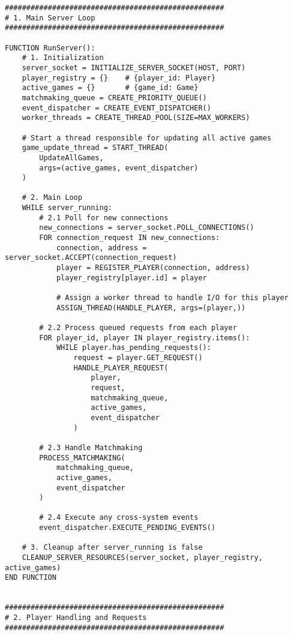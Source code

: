 \documentclass{article}
\begin{document}
\begin{lstlisting}[style=pseudo]
###################################################
# 1. Main Server Loop
###################################################

FUNCTION RunServer():
    # 1. Initialization
    server_socket = INITIALIZE_SERVER_SOCKET(HOST, PORT)
    player_registry = {}    # {player_id: Player}
    active_games = {}       # {game_id: Game}
    matchmaking_queue = CREATE_PRIORITY_QUEUE()  
    event_dispatcher = CREATE_EVENT_DISPATCHER()
    worker_threads = CREATE_THREAD_POOL(SIZE=MAX_WORKERS)
    
    # Start a thread responsible for updating all active games
    game_update_thread = START_THREAD(
        UpdateAllGames, 
        args=(active_games, event_dispatcher)
    )

    # 2. Main Loop
    WHILE server_running:
        # 2.1 Poll for new connections
        new_connections = server_socket.POLL_CONNECTIONS()
        FOR connection_request IN new_connections:
            connection, address = server_socket.ACCEPT(connection_request)
            player = REGISTER_PLAYER(connection, address)
            player_registry[player.id] = player

            # Assign a worker thread to handle I/O for this player
            ASSIGN_THREAD(HANDLE_PLAYER, args=(player,))

        # 2.2 Process queued requests from each player
        FOR player_id, player IN player_registry.items():
            WHILE player.has_pending_requests():
                request = player.GET_REQUEST()
                HANDLE_PLAYER_REQUEST(
                    player, 
                    request, 
                    matchmaking_queue, 
                    active_games, 
                    event_dispatcher
                )

        # 2.3 Handle Matchmaking
        PROCESS_MATCHMAKING(
            matchmaking_queue, 
            active_games, 
            event_dispatcher
        )

        # 2.4 Execute any cross-system events
        event_dispatcher.EXECUTE_PENDING_EVENTS()

    # 3. Cleanup after server_running is false
    CLEANUP_SERVER_RESOURCES(server_socket, player_registry, active_games)
END FUNCTION


###################################################
# 2. Player Handling and Requests
###################################################


\end{lstlisting}
\end{document}
